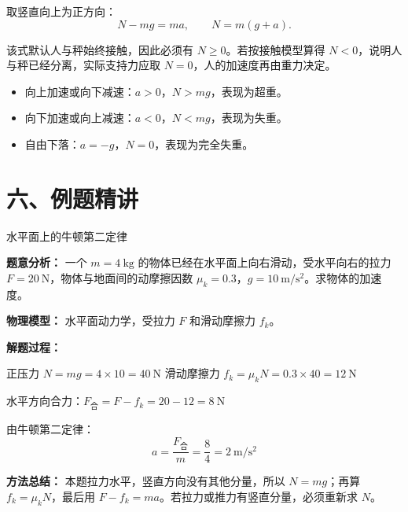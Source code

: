 \begin{center}


\label{fig:apparent-weight-elevator}
\end{center}

取竖直向上为正方向：
\[
N-mg=ma,\qquad N=m(g+a).
\]

该式默认人与秤始终接触，因此必须有 $N\ge 0$。若按接触模型算得 $N<0$，说明人与秤已经分离，实际支持力应取 $N=0$，人的加速度再由重力决定。

\begin{itemize}
  \item 向上加速或向下减速：$a>0$，$N>mg$，表现为超重。
  \item 向下加速或向上减速：$a<0$，$N<mg$，表现为失重。
  \item 自由下落：$a=-g$，$N=0$，表现为完全失重。
\end{itemize}

\section*{六、例题精讲}

\begin{examplebox}{水平面上的牛顿第二定律}

\textbf{题意分析：} 一个 $m = 4\ \mathrm{kg}$ 的物体已经在水平面上向右滑动，受水平向右的拉力 $F = 20\ \mathrm{N}$，物体与地面间的动摩擦因数 $\mu_k = 0.3$，$g = 10\ \mathrm{m/s^2}$。求物体的加速度。

\textbf{物理模型：} 水平面动力学，受拉力 $F$ 和滑动摩擦力 $f_k$。

\textbf{解题过程：}

正压力 $N = mg = 4 \times 10 = 40\ \mathrm{N}$
滑动摩擦力 $f_k = \mu_k N = 0.3 \times 40 = 12\ \mathrm{N}$

水平方向合力：$F_{\text{合}} = F - f_k = 20 - 12 = 8\ \mathrm{N}$

由牛顿第二定律：
\[
a = \frac{F_{\text{合}}}{m} = \frac{8}{4} = 2\ \mathrm{m/s^2}
\]

\textbf{方法总结：} 本题拉力水平，竖直方向没有其他分量，所以 $N = mg$；再算 $f_k = \mu_k N$，最后用 $F - f_k = ma$。若拉力或推力有竖直分量，必须重新求 $N$。

\end{examplebox}

